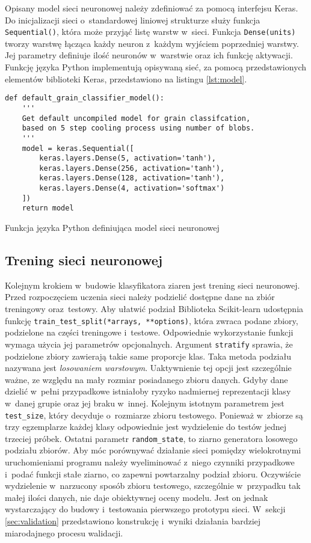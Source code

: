 Opisany model sieci neuronowej należy zdefiniować za pomocą interfejsu
Keras.
Do inicjalizacji sieci o~standardowej liniowej strukturze służy funkcja
\texttt{Sequential()}, która może przyjąć listę warstw w~sieci.
Funkcja \texttt{Dense(units)} tworzy warstwę łącząca każdy neuron
z~każdym wyjściem poprzedniej warstwy.
Jej parametry definiuje ilość neuronów w~warstwie oraz ich funkcję aktywacji.
Funkcję języka Python implementują opisywaną sieć, za pomocą przedstawionych
elementów biblioteki Keras, przedstawiono na listingu \ref{lst:model}.
\begin{listing}[htbp]
\begin{verbatim}
def default_grain_classifier_model():
    '''
    Get default uncompiled model for grain classifcation,
    based on 5 step cooling process using number of blobs.
    '''
    model = keras.Sequential([
        keras.layers.Dense(5, activation='tanh'),
        keras.layers.Dense(256, activation='tanh'),
        keras.layers.Dense(128, activation='tanh'),
        keras.layers.Dense(4, activation='softmax')
    ])
    return model
\end{verbatim}
\caption{Funkcja języka Python definiująca model sieci neuronowej}
\label{lst:model}
\end{listing}

\subsection{Trening sieci neuronowej}
\label{subsec:train}
Kolejnym krokiem w~budowie klasyfikatora ziaren jest trening sieci neuronowej.
Przed rozpoczęciem uczenia sieci należy podzielić dostępne dane na zbiór
treningowy oraz~testowy.
Aby ułatwić podział Biblioteka Scikit-learn udostępnia funkcję
\texttt{train_test_split(*arrays, **options)}, która zwraca
podane zbiory, podzielone na części treningowe i~testowe.
Odpowiednie wykorzystanie funkcji wymaga użycia jej parametrów opcjonalnych.
Argument \texttt{stratify} sprawia, że podzielone zbiory
zawierają takie same proporcje klas.
Taka metoda podziału nazywana jest \emph{losowaniem warstowym}.
Uaktywnienie tej opcji jest szczególnie ważne, ze względu na mały rozmiar
posiadanego zbioru danych.
Gdyby dane dzielić w~pełni przypadkowe istniałoby ryzyko nadmiernej
reprezentacji klasy w~danej grupie oraz jej braku w~innej.
Kolejnym istotnym parametrem jest \texttt{test_size}, który
decyduje o~rozmiarze zbioru testowego.
Ponieważ w~zbiorze są trzy egzemplarze każdej klasy odpowiednie jest
wydzielenie do testów jednej trzeciej próbek.
Ostatni parametr \texttt{random_state}, to ziarno generatora
losowego podziału zbiorów.
Aby móc porównywać działanie sieci pomiędzy wielokrotnymi uruchomieniami
programu należy wyeliminować z~niego czynniki przypadkowe i~podać
funkcji stałe ziarno, co zapewni powtarzalny podział zbioru.
Oczywiście wydzielenie w~narzucony sposób zbioru testowego, szczególnie
w~przypadku tak małej ilości danych, nie daje obiektywnej oceny modelu.
Jest on jednak wystarczający do budowy i~testowania pierwszego prototypu
sieci.
W~sekcji \ref{sec:validation} przedstawiono konstrukcję i~wyniki działania
bardziej miarodajnego procesu walidacji.

